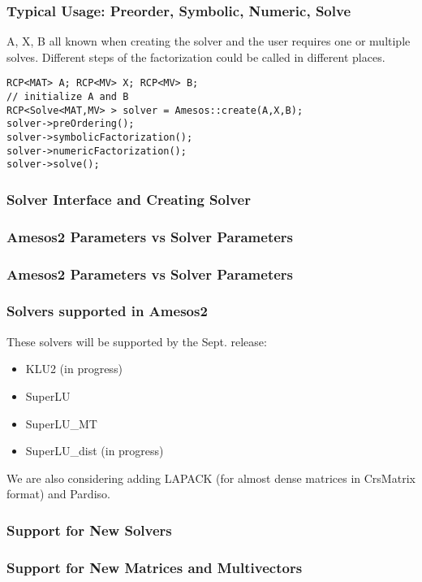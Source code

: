 \documentclass[xcolor=dvipsnames]{beamer}
\begin{document}
\begin{frame}[fragile]
  \frametitle{Typical Usage: Preorder, Symbolic, Numeric, Solve}
  A, X, B all known when creating the solver and the user requires one or
  multiple solves. Different steps of the factorization could be called in
  different places.
  \begin{lstlisting}
RCP<MAT> A; RCP<MV> X; RCP<MV> B;
// initialize A and B
RCP<Solve<MAT,MV> > solver = Amesos::create(A,X,B);
solver->preOrdering();
solver->symbolicFactorization();
solver->numericFactorization();
solver->solve();
  \end{lstlisting}
\end{frame}

\begin{frame}
  \frametitle{Solver Interface and Creating Solver}
\end{frame}

\begin{frame}
  \frametitle{Amesos2 Parameters vs Solver Parameters}
\end{frame}

\begin{frame}
  \frametitle{Amesos2 Parameters vs Solver Parameters}
\end{frame}

\begin{frame}
  \frametitle{Solvers supported in Amesos2}
  These solvers will be supported by the Sept. release:
  \begin{itemize}
  \item KLU2 (in progress)
  \item SuperLU
  \item SuperLU\_MT
  \item SuperLU\_dist (in progress)
  \end{itemize}
We are also considering adding LAPACK (for almost dense matrices in CrsMatrix 
format) and Pardiso.
\end{frame}

\begin{frame}
  \frametitle{Support for New Solvers}
\end{frame}

\begin{frame}
  \frametitle{Support for New Matrices and Multivectors}
\end{frame}
\end{document}

